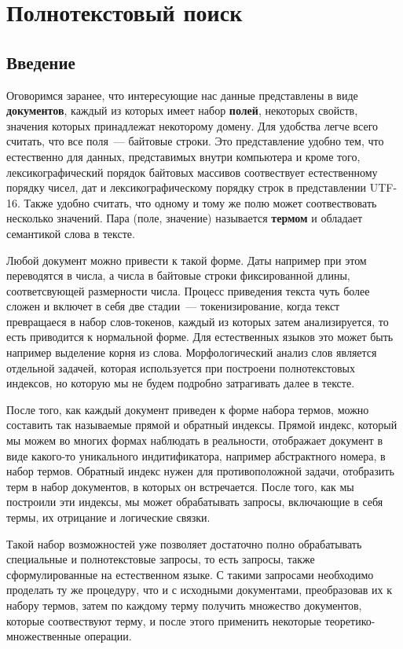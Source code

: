 \section{Полнотекстовый поиск}

\subsection{Введение}

Оговоримся заранее, что интересующие нас данные представлены в виде \textbf{документов}, каждый из которых имеет набор \textbf{полей}, некоторых свойств, значения которых принадлежат некоторому домену. Для удобства легче всего считать, что все поля~--- байтовые строки. Это представление удобно тем, что естественно для данных, представимых внутри компьютера и кроме того, лексикографический порядок байтовых массивов соотвествует естественному порядку чисел, дат и лексикографическому порядку строк в представлении UTF-16. Также удобно считать, что одному и тому же полю может соотвествовать несколько значений. Пара (поле, значение) называется \textbf{термом} и обладает семантикой слова в тексте.

Любой документ можно привести к такой форме. Даты например при этом переводятся в числа, а числа в байтовые строки фиксированной длины, соответсвующей размерности числа. Процесс приведения текста чуть более сложен и включет в себя две стадии~--- токенизирование, когда текст превращаеся в набор слов-токенов, каждый из которых затем анализируется, то есть приводится к нормальной форме. Для естественных языков это может быть например выделение корня из слова. Морфологический анализ слов является отдельной задачей, которая используется при построени полнотекстовых индексов, но которую мы не будем подробно затрагивать далее в тексте.

После того, как каждый документ приведен к форме набора термов, можно составить так называемые прямой и обратный индексы. Прямой индекс, который мы можем во многих формах наблюдать в реальности, отображает документ в виде какого-то уникального индитификатора, например абстрактного номера, в набор термов. Обратный индекс нужен для противоположной задачи, отобразить терм в набор документов, в которых он встречается. После того, как мы построили эти индексы, мы может обрабатывать запросы, включающие в себя термы, их отрицание и логические связки.


Такой набор возможностей уже позволяет достаточно полно обрабатывать специальные и полнотекстовые запросы, то есть запросы, также сформулированные на естественном языке. С такими запросами необходимо проделать ту же процедуру, что и с исходными документами, преобразовав их к набору термов, затем по каждому терму получить множество документов, которые соотвествуют терму, и после этого применить некоторые теоретико-множественные операции.

